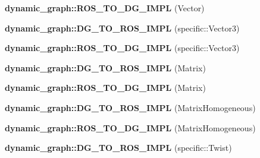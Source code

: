 \begin{DoxyCompactItemize}
\item 
{\bfseries dynamic\+\_\+graph\+::\+R\+O\+S\+\_\+\+T\+O\+\_\+\+D\+G\+\_\+\+I\+M\+PL} (Vector)\hypertarget{namespacedynamic__graph_a3b3e6a25a7275cd7636166190a574df2}{}\label{namespacedynamic__graph_a3b3e6a25a7275cd7636166190a574df2}

\item 
{\bfseries dynamic\+\_\+graph\+::\+D\+G\+\_\+\+T\+O\+\_\+\+R\+O\+S\+\_\+\+I\+M\+PL} (specific\+::\+Vector3)\hypertarget{namespacedynamic__graph_a75ba177999020268d8c9b0547ff9b8b8}{}\label{namespacedynamic__graph_a75ba177999020268d8c9b0547ff9b8b8}

\item 
{\bfseries dynamic\+\_\+graph\+::\+R\+O\+S\+\_\+\+T\+O\+\_\+\+D\+G\+\_\+\+I\+M\+PL} (specific\+::\+Vector3)\hypertarget{namespacedynamic__graph_aa9c6f9a640a7b012b0795531f14c4a95}{}\label{namespacedynamic__graph_aa9c6f9a640a7b012b0795531f14c4a95}

\item 
{\bfseries dynamic\+\_\+graph\+::\+D\+G\+\_\+\+T\+O\+\_\+\+R\+O\+S\+\_\+\+I\+M\+PL} (Matrix)\hypertarget{namespacedynamic__graph_aa521c4cd3ca35d865a96061743a8b42a}{}\label{namespacedynamic__graph_aa521c4cd3ca35d865a96061743a8b42a}

\item 
{\bfseries dynamic\+\_\+graph\+::\+R\+O\+S\+\_\+\+T\+O\+\_\+\+D\+G\+\_\+\+I\+M\+PL} (Matrix)\hypertarget{namespacedynamic__graph_aacf7e86396ce37e356b72a4dd06d4dcd}{}\label{namespacedynamic__graph_aacf7e86396ce37e356b72a4dd06d4dcd}

\item 
{\bfseries dynamic\+\_\+graph\+::\+D\+G\+\_\+\+T\+O\+\_\+\+R\+O\+S\+\_\+\+I\+M\+PL} (Matrix\+Homogeneous)\hypertarget{namespacedynamic__graph_a79b178480de5cd5c8af027c859d6b7e1}{}\label{namespacedynamic__graph_a79b178480de5cd5c8af027c859d6b7e1}

\item 
{\bfseries dynamic\+\_\+graph\+::\+R\+O\+S\+\_\+\+T\+O\+\_\+\+D\+G\+\_\+\+I\+M\+PL} (Matrix\+Homogeneous)\hypertarget{namespacedynamic__graph_a8935e81a8c4ea89b2d6349343d0f276c}{}\label{namespacedynamic__graph_a8935e81a8c4ea89b2d6349343d0f276c}

\item 
{\bfseries dynamic\+\_\+graph\+::\+D\+G\+\_\+\+T\+O\+\_\+\+R\+O\+S\+\_\+\+I\+M\+PL} (specific\+::\+Twist)\hypertarget{namespacedynamic__graph_a31a9095c3881b6bee15e84197900b8cd}{}\label{namespacedynamic__graph_a31a9095c3881b6bee15e84197900b8cd}


\end{DoxyCompactItemize}
